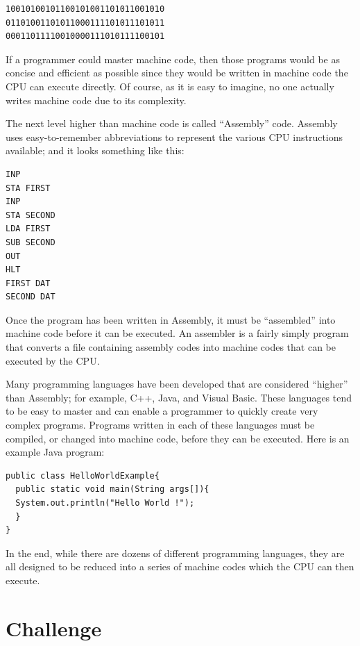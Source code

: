\begin{Verbatim}[frame=lines,
xleftmargin=10mm,
xrightmargin=10mm]
10010100101100101001101011001010
01101001101011000111101011101011
00011011110010000111010111100101
\end{Verbatim}

If a programmer could master machine code, then those programs would be as concise and efficient as possible since they would be written in machine code the \ac{CPU} can execute directly. Of course, as it is easy to imagine, no one actually writes machine code due to its complexity.

The next level higher than machine code is called ``Assembly'' code. Assembly uses easy-to-remember abbreviations to represent the various \ac{CPU} instructions available; and it looks something like this: 

\begin{Verbatim}[frame=lines,
xleftmargin=10mm,
xrightmargin=10mm]
INP
STA FIRST 
INP
STA SECOND 
LDA FIRST 
SUB SECOND
OUT
HLT
FIRST DAT
SECOND DAT
\end{Verbatim}

Once the program has been written in Assembly, it must be ``assembled'' into machine code before it can be executed. An assembler is a fairly simply program that converts a file containing assembly codes into machine codes that can be executed by the \ac{CPU}.

Many programming languages have been developed that are considered ``higher'' than Assembly; for example, C++, Java, and Visual Basic. These languages tend to be easy to master and can enable a programmer to quickly create very complex programs. Programs written in each of these languages must be compiled, or changed into machine code, before they can be executed. Here is an example Java program:

\begin{Verbatim}[frame=lines,
xleftmargin=10mm,
xrightmargin=10mm]
public class HelloWorldExample{
  public static void main(String args[]){
  System.out.println("Hello World !"); 
  }
}
\end{Verbatim}

In the end, while there are dozens of different programming languages, they are all designed to be reduced into a series of machine codes which the \ac{CPU} can then execute.

\section{Challenge}

